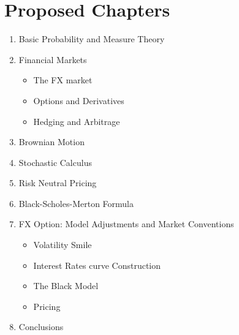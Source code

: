 \documentclass{article}
\begin{document}
\newpage

\section{Proposed Chapters}
\begin{enumerate}
  \item Basic Probability and Measure Theory
  \item Financial Markets
  		\begin{itemize}
  			\item The FX market
  			\item Options and Derivatives
  			\item Hedging and Arbitrage
		\end{itemize}
  \item Brownian Motion
  \item Stochastic Calculus
  \item Risk Neutral Pricing
  \item Black-Scholes-Merton Formula
  \item FX Option: Model Adjustments and Market Conventions
  		\begin{itemize}
  			\item Volatility Smile
  			\item Interest Rates curve Construction
  			\item The Black Model
  			\item Pricing  			
		\end{itemize}
  \item Conclusions
\end{enumerate}


\newpage
\nocite{*}

\end{document}

